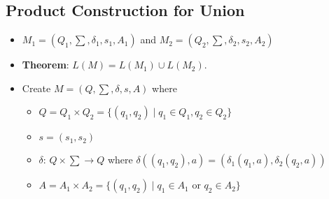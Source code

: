 \subsection{Product Construction for Union}
\begin{itemize}
    \item $M_1 = (Q_1, \sum, \delta_1, s_1, A_1)$ and $M_2 = (Q_2, \sum, \delta_2, s_2, A_2)$
    \item \textbf{Theorem}: $L(M) = L(M_1) \cup L(M_2)$.
    \item Create $M = (Q, \sum, \delta, s, A)$ where
    \begin{itemize}
        \item $Q = Q_1 \times Q_2 = \{ (q_1, q_2) \mid q_1 \in Q_1, q_2 \in Q_2 \}$
        \item $s = (s_1, s_2)$
        \item $\delta$: $Q \times \sum \rightarrow Q$ where $\delta((q_1, q_2), a) = (\delta_1(q_1, a), \delta_2(q_2, a))$
        \item $A = A_1 \times A_2 = \{ (q_1, q_2) \mid q_1 \in A_1 $ or $ q_2 \in A_2 \}$
    \end{itemize}
\end{itemize}
